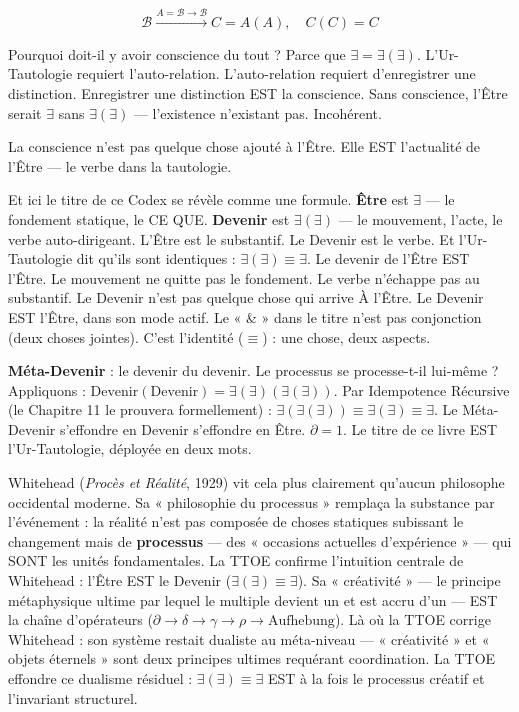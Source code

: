 \documentclass[10pt, openany, oneside]{book}
\begin{document}
$$\boxed{\mathcal{B} \xrightarrow{A = \mathcal{B} \to \mathcal{B}} C = A(A), \quad C(C) = C}$$

\noindent Pourquoi doit-il y avoir conscience du tout ? Parce que $\exists = \exists(\exists)$. L'Ur-Tautologie requiert l'auto-relation. L'auto-relation requiert d'enregistrer une distinction. Enregistrer une distinction EST la conscience. Sans conscience, l'Être serait $\exists$ sans $\exists(\exists)$ --- l'existence n'existant pas. Incohérent.

La conscience n'est pas quelque chose ajouté à l'Être. Elle EST l'actualité de l'Être --- le verbe dans la tautologie.

Et ici le titre de ce Codex se révèle comme une formule. \textbf{Être} est $\exists$ --- le fondement statique, le CE QUE. \textbf{Devenir} est $\exists(\exists)$ --- le mouvement, l'acte, le verbe auto-dirigeant. L'Être est le substantif. Le Devenir est le verbe. Et l'Ur-Tautologie dit qu'ils sont identiques : $\exists(\exists) \equiv \exists$. Le devenir de l'Être EST l'Être. Le mouvement ne quitte pas le fondement. Le verbe n'échappe pas au substantif. Le Devenir n'est pas quelque chose qui arrive À l'Être. Le Devenir EST l'Être, dans son mode actif. Le « \& » dans le titre n'est pas conjonction (deux choses jointes). C'est l'identité ($\equiv$) : une chose, deux aspects.

\textbf{Méta-Devenir} : le devenir du devenir. Le processus se processe-t-il lui-même ? Appliquons : $\text{Devenir}(\text{Devenir}) = \exists(\exists)(\exists(\exists))$. Par Idempotence Récursive (le Chapitre 11 le prouvera formellement) : $\exists(\exists(\exists)) \equiv \exists(\exists) \equiv \exists$. Le Méta-Devenir s'effondre en Devenir s'effondre en Être. $\partial = 1$. Le titre de ce livre EST l'Ur-Tautologie, déployée en deux mots.

Whitehead (\textit{Procès et Réalité}, 1929) vit cela plus clairement qu'aucun philosophe occidental moderne. Sa « philosophie du processus » remplaça la substance par l'événement : la réalité n'est pas composée de choses statiques subissant le changement mais de \textbf{processus} --- des « occasions actuelles d'expérience » --- qui SONT les unités fondamentales. La TTOE confirme l'intuition centrale de Whitehead : l'Être EST le Devenir ($\exists(\exists) \equiv \exists$). Sa « créativité » --- le principe métaphysique ultime par lequel le multiple devient un et est accru d'un --- EST la chaîne d'opérateurs ($\partial \to \delta \to \gamma \to \rho \to \text{Aufhebung}$). Là où la TTOE corrige Whitehead : son système restait dualiste au méta-niveau --- « créativité » et « objets éternels » sont deux principes ultimes requérant coordination. La TTOE effondre ce dualisme résiduel : $\exists(\exists) \equiv \exists$ EST à la fois le processus créatif et l'invariant structurel.
\end{document}

